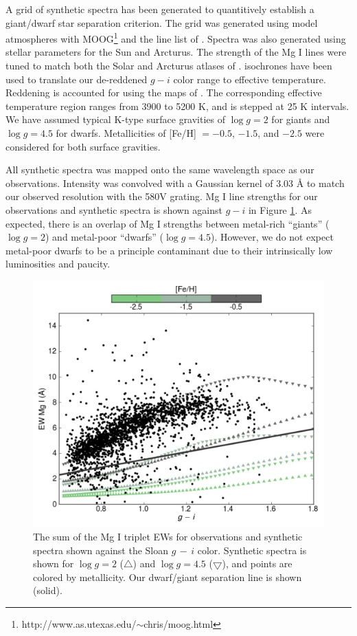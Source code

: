 \documentclass[preprint2]{aastex}
\begin{document}
A grid of synthetic spectra has been generated to quantitively establish a giant/dwarf star separation criterion. The grid was generated using \citet{Castelli;Kurucz_2004} model atmospheres with MOOG\footnote{http://www.as.utexas.edu/$\sim$chris/moog.html} and the line list of \citet{Kurucz;Bell_1995}. Spectra was also generated using stellar parameters for the Sun and Arcturus. The strength of the Mg I lines were tuned to match both the Solar and Arcturus atlases of \citet{Hinkle;et-al_2003}. \citet{Girardi;et-al_2004} isochrones have been used to translate our de-reddened $g - i$ color range to effective temperature. Reddening is accounted for using the maps of \citet{Schlegel;Finkbeiner;Davis_1998}. The corresponding effective temperature region ranges from 3900 to 5200 K, and is stepped at 25 K intervals. We have assumed typical K-type surface gravities of $\log{g} = 2$ for giants and $\log{g} = 4.5$ for dwarfs. Metallicities of [Fe/H] $= -0.5$, $-1.5$, and $-2.5$ were considered for both surface gravities.

All synthetic spectra was mapped onto the same wavelength space as our observations. Intensity was convolved with a Gaussian kernel of 3.03 \AA{} to match our observed resolution with the 580V grating. Mg I line strengths for our observations and synthetic spectra is shown against $g - i$ in Figure \ref{fig:dwarf-giant-separation}. As expected, there is an overlap of Mg I strengths between metal-rich ``giants'' ($\log{g} = 2$) and metal-poor ``dwarfs'' ($\log{g} = 4.5$). However, we do not expect metal-poor dwarfs to be a principle contaminant due to their intrinsically low luminosities and paucity.

\begin{figure}[h]
	\includegraphics[width=\columnwidth]{./dwarf_giant_separation.eps}
	\caption{The sum of the Mg I triplet EWs for observations and synthetic spectra shown against the Sloan $g\,-\,i$ color. Synthetic spectra is shown for $\log{g} = 2$ ($\bigtriangleup$) and $\log{g} = 4.5$ ($\bigtriangledown$), and points are colored by metallicity. Our dwarf/giant separation line is shown (solid). }
	\label{fig:dwarf-giant-separation}
\end{figure}
\end{document}
